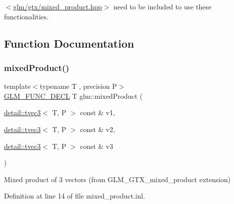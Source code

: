 $<$\hyperlink{mixed__product_8hpp}{glm/gtx/mixed\+\_\+product.\+hpp}$>$ need to be included to use these functionalities. 

\subsection{Function Documentation}
\mbox{\label{group__gtx__mixed__product_ga3c7ec94fdd2b088eac78fb4a0211f32d}} 
\subsubsection{\texorpdfstring{mixed\+Product()}{mixedProduct()}}
{\footnotesize\ttfamily template$<$typename T , precision P$>$ \\
\hyperlink{setup_8hpp_ab2d052de21a70539923e9bcbf6e83a51}{G\+L\+M\+\_\+\+F\+U\+N\+C\+\_\+\+D\+E\+CL} T glm\+::mixed\+Product (\begin{DoxyParamCaption}\item[{\hyperlink{structglm_1_1detail_1_1tvec3}{detail\+::tvec3}$<$ T, P $>$ const \&}]{v1,  }\item[{\hyperlink{structglm_1_1detail_1_1tvec3}{detail\+::tvec3}$<$ T, P $>$ const \&}]{v2,  }\item[{\hyperlink{structglm_1_1detail_1_1tvec3}{detail\+::tvec3}$<$ T, P $>$ const \&}]{v3 }\end{DoxyParamCaption})}



Mixed product of 3 vectors (from G\+L\+M\+\_\+\+G\+T\+X\+\_\+mixed\+\_\+product extension) 



Definition at line 14 of file mixed\+\_\+product.\+inl.


